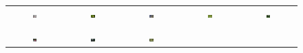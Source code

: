 \begin{figure}[th]
{\small{
\begin{center}
\begin{tabular}{@{}c@{\,\,\,}c@{\,\,\,}c@{\,\,\,}c@{\,\,\,}c@{\,\,\,}}
\vspace{10pt}
\includegraphics[width=0.08\textwidth]{imggrid/falseposi/6.jpg} &
\includegraphics[width=0.08\textwidth]{imggrid/falseposi/7.jpg} &
\includegraphics[width=0.08\textwidth]{imggrid/falseposi/8.jpg} &
\includegraphics[width=0.08\textwidth]{imggrid/falseposi/9.jpg} &
\includegraphics[width=0.08\textwidth]{imggrid/falseposi/10.jpg} \\
\\[-6pt]
\hline
\\[-6pt]
\includegraphics[width=0.08\textwidth]{imggrid/falseposi/16.jpg} &
\includegraphics[width=0.08\textwidth]{imggrid/falseposi/17.jpg} &
\includegraphics[width=0.08\textwidth]{imggrid/falseposi/18.jpg} &

\end{tabular}
\end{center}}}
\end{figure}
